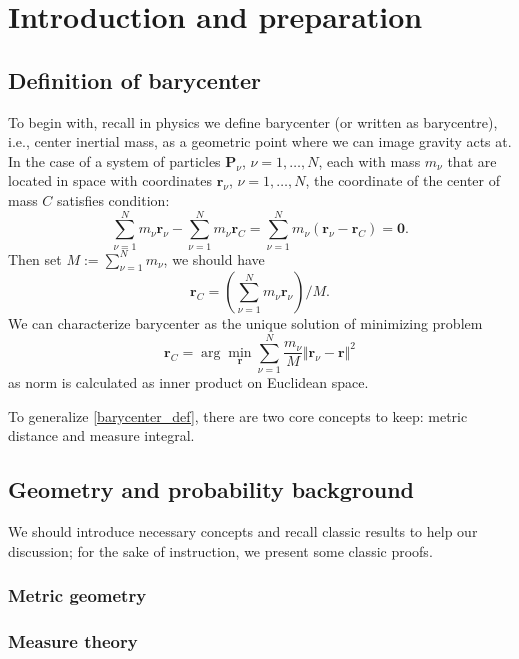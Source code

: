 \chapter{Introduction and preparation}
\section{Definition of barycenter}
To begin with, recall in physics we define barycenter (or written as barycentre), i.e.,  center inertial mass, as a geometric point where we can image gravity acts at. In the case of a system of particles $\boldsymbol{P}_\nu$, $\nu = 1, \ldots , N$, each with mass $m_\nu$ that are located in space with coordinates $\boldsymbol{r}_\nu$, $\nu = 1, \ldots , N$, the coordinate of the center of mass $C$ satisfies condition:
\[
	\sum _{\nu=1}^{N} m_{\nu}\boldsymbol {r}_{\nu} -	\sum _{\nu=1}^{N}m_{\nu}\boldsymbol {r}_C = \sum _{\nu=1}^{N}m_{\nu}(\boldsymbol {r} _{\nu}-\boldsymbol {r}_C )=\boldsymbol {0}.
\]
Then set \( M := \sum _ { \nu = 1 } ^ { N } m _ { \nu } \), we should have
\[
	\boldsymbol { r } _ { C } = \left( \sum _ { \nu = 1 } ^ { N } m _ { \nu } \boldsymbol { r } _ { \nu } \right) / M .
\]
We can characterize barycenter as the unique solution of minimizing problem
\begin{equation}
	\label{barycenter_def}
	\boldsymbol{r}_C = \operatorname{arg} \min_{\boldsymbol{r}} \sum_{\nu= 1}^N \frac{m_\nu}{M} \Vert \boldsymbol{r}_{\nu} - \boldsymbol{r}\Vert^2
\end{equation}
as norm is calculated as inner product on Euclidean space.

To generalize \autoref{barycenter_def}, there are two core concepts to keep: metric distance and measure integral.

\section{Geometry and probability background}
We should introduce necessary concepts and recall classic results to help our discussion; for the sake of instruction, we present some classic proofs.
\subsection{Metric geometry}
\subsection{Measure theory}


